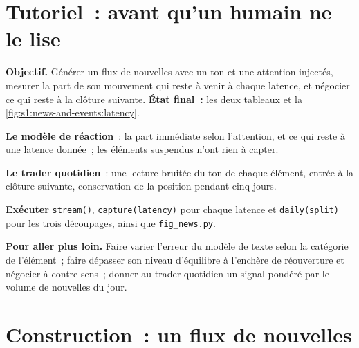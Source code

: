 \section{Tutoriel~: avant qu'un humain ne le lise}\label{tut:s1:news-and-events:tut}

\begin{tutorial}
\textbf{Objectif.} Générer un flux de nouvelles avec un ton et une attention injectés, mesurer la part de son mouvement qui reste à venir à chaque latence, et négocier ce qui reste
à la clôture suivante. \textbf{État final~:} les deux tableaux et la \cref{fig:s1:news-and-events:latency}.
\begin{tutsteps}
\item \textbf{Le modèle de réaction}~: la part immédiate selon l'attention, et ce qui reste à une latence donnée~; les éléments suspendus n'ont rien à capter.
\label{lst:s1:news-and-events:remaining}
\item \textbf{Le trader quotidien}~: une lecture bruitée du ton de chaque élément, entrée à la clôture suivante, conservation de la position pendant cinq jours.
\label{lst:s1:news-and-events:daily}
\item \textbf{Exécuter} \texttt{stream()}, \texttt{capture(latency)} pour chaque latence et \texttt{daily(split)} pour les trois découpages, ainsi que \texttt{fig\_news.py}.
\end{tutsteps}
\textbf{Pour aller plus loin.} Faire varier l'erreur du modèle de texte selon la catégorie de l'élément~; faire dépasser son niveau d'équilibre à l'enchère de réouverture et négocier à contre-sens~; donner
au trader quotidien un signal pondéré par le volume de nouvelles du jour.
\end{tutorial}

\section{Construction~: un flux de nouvelles}\label{bld:s1:news-and-events:newsevent}

